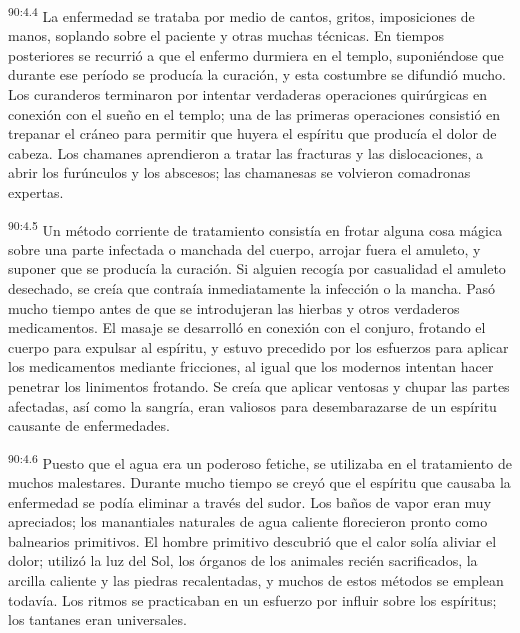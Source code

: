 \documentclass[twoside, 11pt]{book}
\begin{document}
\par
\textsuperscript{90:4.4} La enfermedad se trataba por medio de cantos, gritos, imposiciones de manos, soplando sobre el paciente y otras muchas técnicas. En tiempos posteriores se recurrió a que el enfermo durmiera en el templo, suponiéndose que durante ese período se producía la curación, y esta costumbre se difundió mucho. Los curanderos terminaron por intentar verdaderas operaciones quirúrgicas en conexión con el sueño en el templo; una de las primeras operaciones consistió en trepanar el cráneo para permitir que huyera el espíritu que producía el dolor de cabeza. Los chamanes aprendieron a tratar las fracturas y las dislocaciones, a abrir los furúnculos y los abscesos; las chamanesas se volvieron comadronas expertas.

\par
\textsuperscript{90:4.5} Un método corriente de tratamiento consistía en frotar alguna cosa mágica sobre una parte infectada o manchada del cuerpo, arrojar fuera el amuleto, y suponer que se producía la curación. Si alguien recogía por casualidad el amuleto desechado, se creía que contraía inmediatamente la infección o la mancha. Pasó mucho tiempo antes de que se introdujeran las hierbas y otros verdaderos medicamentos. El masaje se desarrolló en conexión con el conjuro, frotando el cuerpo para expulsar al espíritu, y estuvo precedido por los esfuerzos para aplicar los medicamentos mediante fricciones, al igual que los modernos intentan hacer penetrar los linimentos frotando. Se creía que aplicar ventosas y chupar las partes afectadas, así como la sangría, eran valiosos para desembarazarse de un espíritu causante de enfermedades.

\par
\textsuperscript{90:4.6} Puesto que el agua era un poderoso fetiche, se utilizaba en el tratamiento de muchos malestares. Durante mucho tiempo se creyó que el espíritu que causaba la enfermedad se podía eliminar a través del sudor. Los baños de vapor eran muy apreciados; los manantiales naturales de agua caliente florecieron pronto como balnearios primitivos. El hombre primitivo descubrió que el calor solía aliviar el dolor; utilizó la luz del Sol, los órganos de los animales recién sacrificados, la arcilla caliente y las piedras recalentadas, y muchos de estos métodos se emplean todavía. Los ritmos se practicaban en un esfuerzo por influir sobre los espíritus; los tantanes eran universales.
\end{document}
